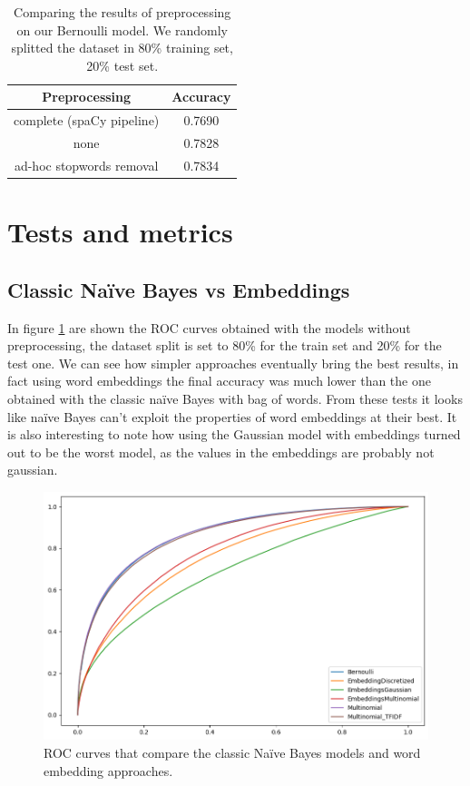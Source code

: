 \documentclass{article}
\begin{document}
    \begin{table}[h!t]
        \centering
        \caption{Comparing the results of preprocessing on our Bernoulli model. We randomly splitted the dataset in 80\% training set, 20\% test set.}
        \label{tab:stopwords}
        \begin{tabular}{c|c}
            \hline
            Preprocessing & Accuracy \\
            \hline 
            complete (spaCy pipeline) & 0.7690 \\ 
            none & 0.7828 \\ 
            ad-hoc stopwords removal & 0.7834 \\ 
            \hline
        \end{tabular}
    \end{table}
    
    
    \section*{Tests and metrics}

    \subsection*{Classic Na\"ive Bayes vs Embeddings}
    
    In figure \ref{fig:classic_nb_vs_embeddings} are shown the ROC curves obtained with the models without preprocessing, the dataset split is set to 80\% for the train set and 20\% for the test one.
    We can see how simpler approaches eventually bring the best results, in fact using word embeddings the final accuracy was much lower than the one obtained with the classic na\"ive Bayes with bag of words. From these tests it looks like na\"ive Bayes can't exploit the properties of word embeddings at their best. It is also interesting to note how using the Gaussian model with embeddings turned out to be the worst model, as the values in the embeddings are probably not gaussian.
    
    \begin{figure}[h!t]
        \centering
        \includegraphics[scale=0.50]{../experiments/plots/classic_nb_vs_embeddings}
        \caption{ROC curves that compare the classic Na\"ive Bayes models and
        word embedding approaches.}
        \label{fig:classic_nb_vs_embeddings}        
    \end{figure}
    
\end{document}
